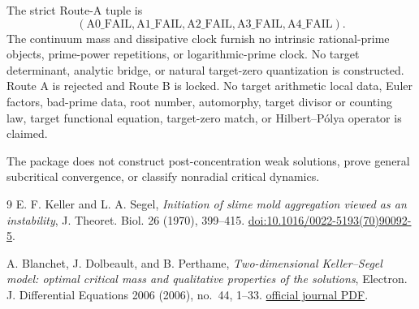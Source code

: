 \documentclass[10pt]{article}
\begin{document}
The strict Route-A tuple is
\[
 (\mathrm{A0\_FAIL},\mathrm{A1\_FAIL},\mathrm{A2\_FAIL},
  \mathrm{A3\_FAIL},\mathrm{A4\_FAIL}).
\]
The continuum mass and dissipative clock furnish no intrinsic rational-prime
objects, prime-power repetitions, or logarithmic-prime clock.  No target
determinant, analytic bridge, or natural target-zero quantization is
constructed.  Route A is rejected and Route B is locked.  No target arithmetic
local data, Euler factors, bad-prime data, root number, automorphy, target
divisor or counting law, target functional equation, target-zero match, or
Hilbert--P\'olya operator is claimed.

The package does not construct post-concentration weak solutions, prove
general subcritical convergence, or classify nonradial critical dynamics.

\begin{thebibliography}{9}
E. F. Keller and L. A. Segel,
\emph{Initiation of slime mold aggregation viewed as an instability},
J. Theoret. Biol. 26 (1970), 399--415.
\href{https://doi.org/10.1016/0022-5193(70)90092-5}{doi:10.1016/0022-5193(70)90092-5}.

A. Blanchet, J. Dolbeault, and B. Perthame,
\emph{Two-dimensional Keller--Segel model: optimal critical mass and
qualitative properties of the solutions},
Electron. J. Differential Equations 2006 (2006), no.~44, 1--33.
\href{https://ejde.math.txstate.edu/Volumes/2006/44/blanchet.pdf}{official journal PDF}.
\end{thebibliography}
\fi
\end{document}

